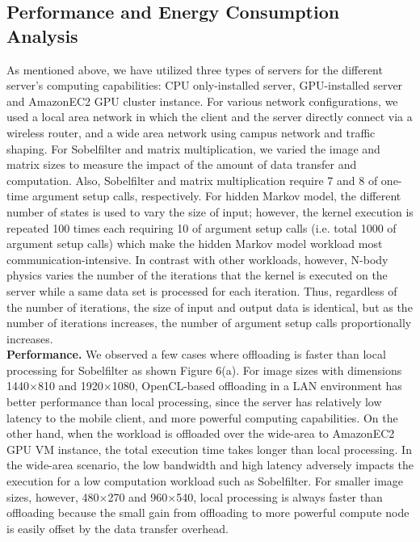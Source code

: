 \documentclass[10pt, conference, compsocconf]{IEEEtran}
\begin{document}
\subsection{Performance and Energy Consumption Analysis}
%
As mentioned above, we have utilized three types of servers for the 
different server’s computing capabilities: CPU only-installed server, 
GPU-installed server and AmazonEC2 GPU cluster instance.
%
For various network configurations, we used a local area network in which
the client and the server directly connect via a wireless router, and a wide 
area network using campus network and traffic shaping.
%
For Sobelfilter and matrix multiplication, we varied the image and matrix 
sizes to measure the impact of the amount of data transfer and computation.
%
Also, Sobelfilter and matrix multiplication require 7 and 8 of one-time 
argument setup calls, respectively.
%
For hidden Markov model, the different number of states is used to vary 
the size of input; however, the kernel execution is repeated 100 times each 
requiring 10 of argument setup calls (i.e. total 1000 of argument 
setup calls) which make the hidden Markov model workload most 
communication-intensive.
%
In contrast with other workloads, however, N-body physics varies the 
number of the iterations that the kernel is executed on the server while a
same data set is processed for each iteration.
%
Thus, regardless of the number of iterations, the size of input and output
data is identical, but as the number of iterations increases, the number of
argument setup calls proportionally increases.\\
%
\indent\textbf{Performance.} We observed a few cases where offloading is faster than local 
processing for Sobelfilter as shown Figure 6(a).
%
For image sizes with dimensions 1440$\times$810 and 1920$\times$1080, OpenCL-based 
offloading in a LAN environment has better performance than local processing,
since the server has relatively low latency to the mobile client, and more
powerful computing capabilities.
%
On the other hand, when the workload is offloaded over the wide-area to
AmazonEC2 GPU VM instance, the total execution time takes longer than
local processing.
%
In the wide-area scenario, the low bandwidth and high latency adversely
impacts the execution for a low computation workload such as Sobelfilter.
%
For smaller image sizes, however, 480$\times$270 and 960$\times$540, local processing
is always faster than offloading because the small gain from offloading 
to more powerful compute node is easily offset by the data transfer
overhead.\\
\end{document}
